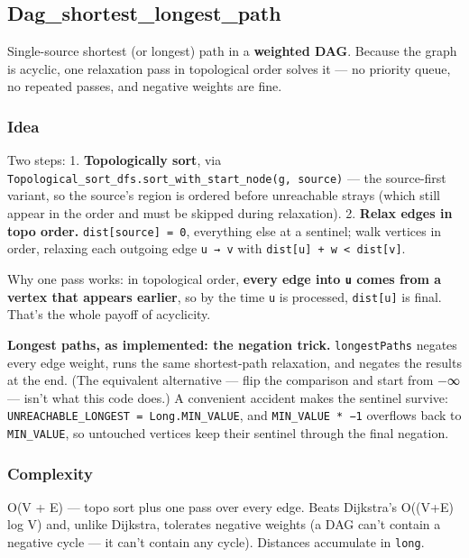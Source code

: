 \documentclass[
  10pt,
  letterpaper,
  onecolumn]{article}
\begin{document}
\hypertarget{dag_shortest_longest_path}{%
\subsection{Dag\_shortest\_longest\_path}\label{dag_shortest_longest_path}}

Single-source shortest (or longest) path in a \textbf{weighted DAG}.
Because the graph is acyclic, one relaxation pass in topological order
solves it --- no priority queue, no repeated passes, and negative
weights are fine.

\hypertarget{idea-16}{%
\subsubsection{Idea}\label{idea-16}}

Two steps: 1. \textbf{Topologically sort}, via
\texttt{Topological\_sort\_dfs.sort\_with\_start\_node(g,\ source)} ---
the source-first variant, so the source's region is ordered before
unreachable strays (which still appear in the order and must be skipped
during relaxation). 2. \textbf{Relax edges in topo order.}
\texttt{dist{[}source{]}\ =\ 0}, everything else at a sentinel; walk
vertices in order, relaxing each outgoing edge \texttt{u\ →\ v} with
\texttt{dist{[}u{]}\ +\ w\ \textless{}\ dist{[}v{]}}.

Why one pass works: in topological order, \textbf{every edge into
\texttt{u} comes from a vertex that appears earlier}, so by the time
\texttt{u} is processed, \texttt{dist{[}u{]}} is final. That's the whole
payoff of acyclicity.

\textbf{Longest paths, as implemented: the negation trick.}
\texttt{longestPaths} negates every edge weight, runs the same
shortest-path relaxation, and negates the results at the end. (The
equivalent alternative --- flip the comparison and start from −∞ ---
isn't what this code does.) A convenient accident makes the sentinel
survive: \texttt{UNREACHABLE\_LONGEST\ =\ Long.MIN\_VALUE}, and
\texttt{MIN\_VALUE\ *\ −1} overflows back to \texttt{MIN\_VALUE}, so
untouched vertices keep their sentinel through the final negation.

\hypertarget{complexity-16}{%
\subsubsection{Complexity}\label{complexity-16}}

O(V + E) --- topo sort plus one pass over every edge. Beats Dijkstra's
O((V+E) log V) and, unlike Dijkstra, tolerates negative weights (a DAG
can't contain a negative cycle --- it can't contain any cycle).
Distances accumulate in \texttt{long}.
\end{document}
